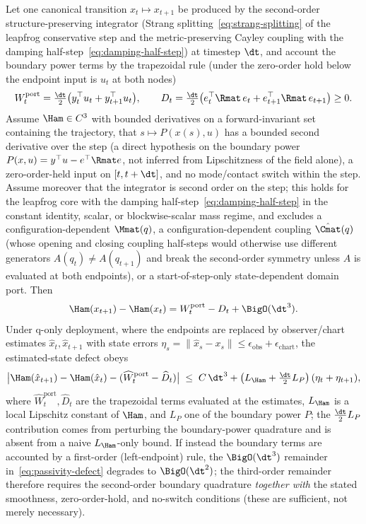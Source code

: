 \begin{theorem}
\label{thm:passivity-defect}
Let one canonical transition $x_t\mapsto x_{t+1}$ be produced by the second-order structure-preserving integrator (Strang splitting~\eqref{eq:strang-splitting} of the leapfrog conservative step and the metric-preserving Cayley coupling with the damping half-step~\eqref{eq:damping-half-step}) at timestep $\dt$, and account the boundary power terms by the trapezoidal rule (under the zero-order hold below the endpoint input is $u_t$ at both nodes)
\begin{equation}
W^{\mathrm{port}}_t=\tfrac{\dt}{2}\bigl(y_t^\top u_t+y_{t+1}^\top u_t\bigr),
\qquad
D_t=\tfrac{\dt}{2}\bigl(e_t^\top\Rmat\,e_t+e_{t+1}^\top\Rmat\,e_{t+1}\bigr)\ge 0 .
\end{equation}
Assume $\Ham\in C^3$ with bounded derivatives on a forward-invariant set containing the trajectory, that $s\mapsto P(x(s),u)$ has a bounded second derivative over the step (a direct hypothesis on the boundary power $P(x,u)=y^\top u-e^\top\Rmat e$, not inferred from Lipschitzness of the field alone), a zero-order-held input on $[t,t+\dt]$, and no mode/contact switch within the step. Assume moreover that the integrator is second order on the step; this holds for the leapfrog core with the damping half-step~\eqref{eq:damping-half-step} in the constant identity, scalar, or blockwise-scalar mass regime, and excludes a configuration-dependent $\Mmat(q)$, a configuration-dependent coupling $\hat{\Cmat}(q)$ (whose opening and closing coupling half-steps would otherwise use different generators $A(q_t)\neq A(q_{t+1})$ and break the second-order symmetry unless $A$ is evaluated at both endpoints), or a start-of-step-only state-dependent domain port. Then
\begin{equation}
\Ham(x_{t+1})-\Ham(x_t)=W^{\mathrm{port}}_t-D_t+\BigO(\dt^3).
\label{eq:passivity-defect}
\end{equation}
Under q-only deployment, where the endpoints are replaced by observer/chart estimates $\hat{x}_t,\hat{x}_{t+1}$ with state errors $\eta_s=\lVert\hat{x}_s-x_s\rVert\le\epsilon_{\mathrm{obs}}+\epsilon_{\mathrm{chart}}$, the estimated-state defect obeys
\begin{equation}
\bigl|\Ham(\hat{x}_{t+1})-\Ham(\hat{x}_t)-(\widehat W^{\mathrm{port}}_t-\widehat D_t)\bigr|
\;\le\; C\,\dt^3+\bigl(L_{\Ham}+\tfrac{\dt}{2}L_P\bigr)\,(\eta_t+\eta_{t+1}),
\end{equation}
where $\widehat W^{\mathrm{port}}_t,\widehat D_t$ are the trapezoidal terms evaluated at the estimates, $L_{\Ham}$ is a local Lipschitz constant of $\Ham$, and $L_P$ one of the boundary power $P$; the $\tfrac{\dt}{2}L_P$ contribution comes from perturbing the boundary-power quadrature and is absent from a naive $L_{\Ham}$-only bound.
If instead the boundary terms are accounted by a first-order (left-endpoint) rule, the $\BigO(\dt^3)$ remainder in~\eqref{eq:passivity-defect} degrades to $\BigO(\dt^2)$; the third-order remainder therefore requires the second-order boundary quadrature \emph{together with} the stated smoothness, zero-order-hold, and no-switch conditions (these are sufficient, not merely necessary).
\end{theorem}

